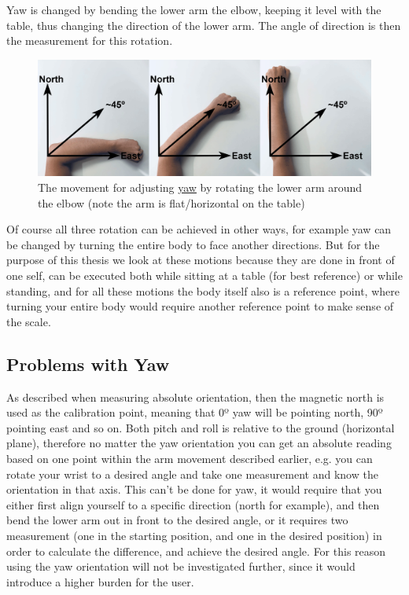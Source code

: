 Yaw is changed by bending the lower arm the elbow, keeping it level with the table, thus changing the direction of the lower arm. The angle of direction is then the measurement for this rotation.

\begin{figure}[h!]
    \centering
    \includegraphics[width=1\textwidth]{figures/yaw.png}
    \caption{The movement for adjusting \underline{yaw} by rotating the lower arm around the elbow (note the arm is flat/horizontal on the table)}
    \label{yaw}
\end{figure}

Of course all three rotation can be achieved in other ways, for example yaw can be changed by turning the entire body to face another directions. But for the purpose of this thesis we look at these motions because they are done in front of one self, can be executed both while sitting at a table (for best reference) or while standing, and for all these motions the body itself also is a reference point, where turning your entire body would require another reference point to make sense of the scale.

\subsection{Problems with Yaw}
As described when measuring absolute orientation, then the magnetic north is used as the calibration point, meaning that 0º yaw will be pointing north, 90º pointing east and so on. Both pitch and roll is relative to the ground (horizontal plane), therefore no matter the yaw orientation you can get an absolute reading based on one point within the arm movement described earlier, e.g. you can rotate your wrist to a desired angle and take one measurement and know the orientation in that axis. This can't be done for yaw, it would require that you either first align yourself to a specific direction (north for example), and then bend the lower arm out in front to the desired angle, or it requires two measurement (one in the starting position, and one in the desired position) in order to calculate the difference, and achieve the desired angle. For this reason using the yaw orientation will not be investigated further, since it would introduce a higher burden for the user.

